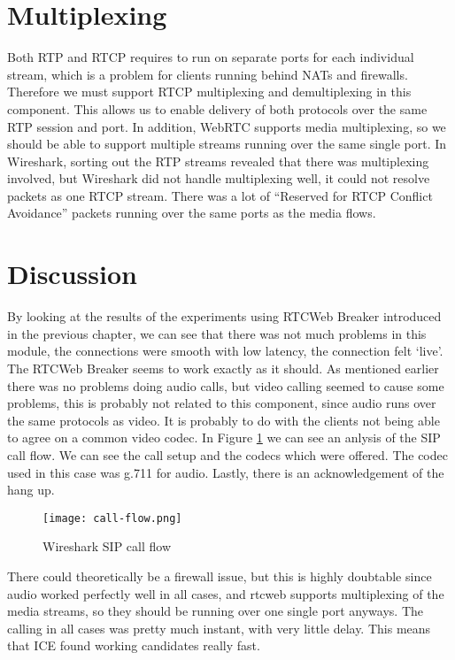 \section{Multiplexing}
Both RTP and RTCP requires to run on separate ports for each individual stream, which is a problem for clients running behind NATs and firewalls. Therefore we must support RTCP multiplexing and demultiplexing in this component. This allows us to enable delivery of both protocols over the same RTP session and port. In addition, WebRTC supports media multiplexing, so we should be able to support multiple streams running over the same single port. In Wireshark, sorting out the RTP streams revealed that there was multiplexing involved, but Wireshark did not handle multiplexing well, it could not resolve packets as one RTCP stream. There was a lot of ``Reserved for RTCP Conflict Avoidance'' packets running over the same ports as the media flows.

\section{Discussion}
By looking at the results of the experiments using RTCWeb Breaker introduced in the previous chapter, we can see that there was not much problems in this module, the connections were smooth with low latency, the connection felt `live'. The RTCWeb Breaker seems to work exactly as it should. As mentioned earlier there was no problems doing audio calls, but video calling seemed to cause some problems, this is probably not related to this component, since audio runs over the same protocols as video. It is probably to do with the clients not being able to agree on a common video codec. In Figure \ref{fig:wireshark-sip-call-flow} we can see an anlysis of the SIP call flow. We can see the call setup and the codecs which were offered. The codec used in this case was g.711 for audio. Lastly, there is an acknowledgement of the hang up.

\begin{figure}[here]
\centerline{\texttt{[image: call-flow.png]}}
\caption{Wireshark SIP call flow}
\label{fig:wireshark-sip-call-flow}
\end{figure}

There could theoretically be a firewall issue, but this is highly doubtable since audio worked perfectly well in all cases, and \gls{rtcweb} supports multiplexing of the media streams, so they should be running over one single port anyways. The calling in all cases was pretty much instant, with very little delay. This means that ICE found working candidates really fast.

